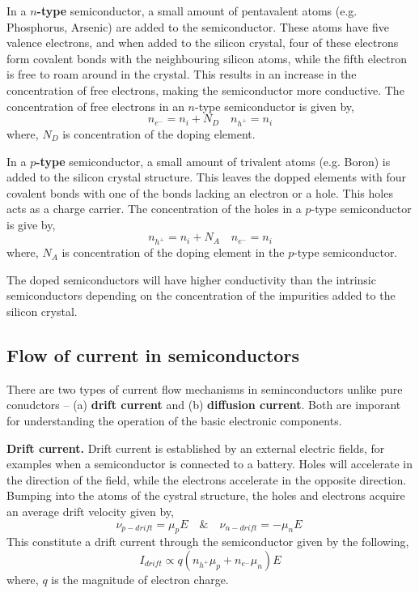 In a \textbf{$n$-type} semiconductor, a small amount of pentavalent atoms (e.g. Phosphorus, Arsenic) are added to the semiconductor. These atoms have five valence electrons, and when added to the silicon crystal, four of these electrons form covalent bonds with the neighbouring silicon atoms, while the fifth electron is free to roam around in the crystal. This results in an increase in the concentration of free electrons, making the semiconductor more conductive. The concentration of free electrons in an $n$-type semiconductor is given by,
\begin{equation}
    n_{e^-} = n_i + N_D \quad n_{h^+} = n_i
    \label{eq:ch03-n-type-elec-conc}
\end{equation}
where, $N_D$ is concentration of the doping element.

In a \textbf{$p$-type} semiconductor, a small amount of trivalent atoms (e.g. Boron) is added to the silicon crystal structure. This leaves the dopped elements with four covalent bonds with one of the bonds lacking an electron or a hole. This holes acts as a charge carrier. The concentration of the holes in a $p$-type semiconductor is give by,
\begin{equation}
    n_{h^+} = n_i + N_A \quad n_{e^-} = n_i
    \label{eq:ch03-p-type-elec-conc}
\end{equation}
where, $N_A$ is concentration of the doping element in the $p$-type semiconductor.

The doped semiconductors will have higher conductivity than the intrinsic semiconductors depending on the concentration of the impurities added to the silicon crystal.

\subsection{Flow of current in semiconductors}
There are two types of current flow mechanisms in seminconductors unlike pure conudctors -- (a) \textbf{drift current} and (b) \textbf{diffusion current}. Both are imporant for understanding the operation of the basic electronic components.

\noindent\textbf{Drift current.} Drift current is established by an external electric fields, for examples when a semiconductor is connected to a battery. Holes will accelerate in the direction of the field, while the electrons accelerate in the opposite direction. Bumping into the atoms of the cystral structure, the holes and electrons acquire an average drift velocity given by,
\begin{equation}
    \nu_{p-drift} = \mu_p E \quad \& \quad \nu_{n-drift} = -\mu_n E\
    \label{eq:ch03-drift-vel}
\end{equation}
This constitute a drift current through the semiconductor given by the following,
\begin{equation}
    I_{drift} \propto q\left(n_{h^+}\mu_p + n_{e^-}\mu_n \right) E
    \label{eq:ch03-drift-current}
\end{equation}
where, $q$ is the magnitude of electron charge.

